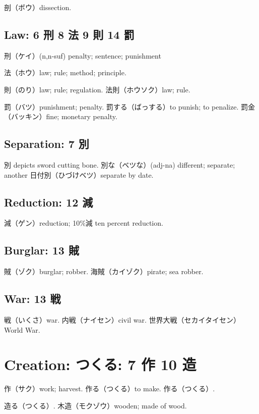 剖（ボウ）dissection.

\subsection{Law: 6 刑 8 法 9 則 14 罰}

刑（ケイ）(n,n-suf) penalty; sentence; punishment

法（ホウ）law; rule; method; principle.

則（のり）law; rule; regulation.
法則（ホウソク）law; rule.

罰（バツ）punishment; penalty.
罰する（ばっする）to punish; to penalize.
罰金（バッキン）fine; monetary penalty.

\subsection{Separation: 7 別}

別 depicts sword cutting bone.
別な（ベツな）(adj-na) different; separate; another
日付別（ひづけベツ）separate by date.

\subsection{Reduction: 12 減}

減（ゲン）reduction; 10\%減 ten percent reduction.

\subsection{Burglar: 13 賊}

賊（ゾク）burglar; robber.
海賊（カイゾク）pirate; sea robber.

\subsection{War: 13 戦}

戦（いくさ）war.
内戦（ナイセン）civil war.
世界大戦（セカイタイセン）World War.

\section{Creation: つくる: 7 作 10 造}

作（サク）work; harvest.
作る（つくる）to make.
作る（つくる）.

造る（つくる）.
木造（モクゾウ）wooden; made of wood.
